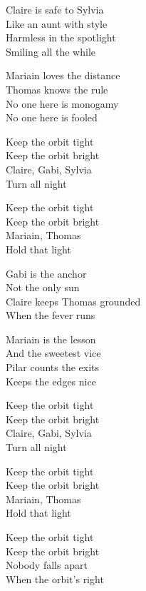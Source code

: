\begin{lyrics}
Claire is safe to Sylvia\\
Like an aunt with style\\
Harmless in the spotlight\\
Smiling all the while

Mariain loves the distance\\
Thomas knows the rule\\
No one here is monogamy\\
No one here is fooled

Keep the orbit tight\\
Keep the orbit bright\\
Claire, Gabi, Sylvia\\
Turn all night

Keep the orbit tight\\
Keep the orbit bright\\
Mariain, Thomas\\
Hold that light

Gabi is the anchor\\
Not the only sun\\
Claire keeps Thomas grounded\\
When the fever runs

Mariain is the lesson\\
And the sweetest vice\\
Pilar counts the exits\\
Keeps the edges nice

Keep the orbit tight\\
Keep the orbit bright\\
Claire, Gabi, Sylvia\\
Turn all night

Keep the orbit tight\\
Keep the orbit bright\\
Mariain, Thomas\\
Hold that light

Keep the orbit tight\\
Keep the orbit bright\\
Nobody falls apart\\
When the orbit’s right

\end{lyrics}

